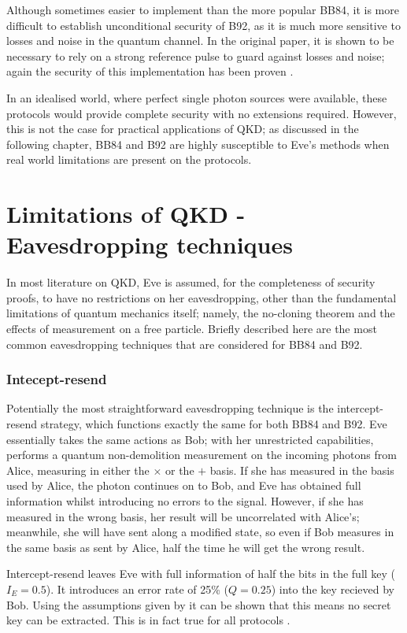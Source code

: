 \documentclass[paper=a4, fontsize=11pt]{scrartcl} %
\numberwithin{equation}{section} %
\numberwithin{figure}{section} %
\numberwithin{table}{section} %
\begin{document}
Although sometimes easier to implement than the more popular BB84, it is more difficult to establish
unconditional security of B92, as it is much more sensitive to losses and noise in the
quantum channel. In the original paper, it is shown to be necessary
to rely on a strong reference pulse to guard against
losses and noise; again the security of this implementation has been proven
\citep{tamakiStrongRefProofB92}.

In an idealised world, where perfect single photon sources were available,
these protocols would provide complete security with no extensions required.
However, this is not the case for practical applications of QKD;
as discussed in the following chapter, BB84 and B92 are highly susceptible to
Eve's methods when real world limitations are present on the protocols.

\section{Limitations of QKD - Eavesdropping techniques}
In most literature on QKD, Eve is assumed, for the completeness of security proofs, to have no restrictions
on her eavesdropping, other than the fundamental limitations of quantum mechanics itself; namely, the
no-cloning theorem and the effects of measurement on a free particle. Briefly described here are the
most common eavesdropping techniques that are considered for BB84 and B92.

\subsubsection{Intecept-resend}
Potentially the most straightforward eavesdropping technique is the intercept-resend
strategy, which functions exactly the same for both BB84 and  B92.
Eve essentially takes the same actions as Bob; with her unrestricted capabilities, performs
a quantum non-demolition measurement on the incoming photons from Alice, measuring in either the $\times$
or the $+$ basis. If she has measured in the basis used by Alice, the photon continues on to Bob,
and Eve has obtained full information whilst introducing no errors to the signal. However, if she has measured
in the wrong basis, her result will be uncorrelated with Alice's; meanwhile, she will have sent along
a modified state, so even if Bob measures in the same basis as sent by Alice, half the time he will get the
wrong result. \citep{reviewScariani}

Intercept-resend leaves Eve with full information of half the bits in the full key ($I_E = 0.5$). It introduces
an error rate of 25\% ($Q = 0.25$) into the key recieved by Bob. Using the assumptions given by \citet{csiszarAssump}
it can be shown that this means no secret key can be extracted. This is in fact true for all protocols \citep{reviewScariani}.
\end{document}
